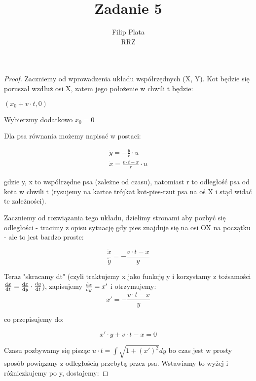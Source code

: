 \documentclass[12pt]{article}
\begin{document}
 
 
 
\title{Zadanie 5}%
\author{Filip Plata\\ %
RRZ} %
 
\maketitle
 
\begin{proof} %
Zaczniemy od wprowadzenia układu współrzędnych (X, Y). Kot będzie się poruszał wzdłuż osi X, zatem jego położenie w chwili t będzie: 

$ (x_{0} + v \cdot t, 0) $

Wybierzmy dodatkowo $x_{0} = 0$

Dla psa równania możemy napisać w postaci:

\begin{gather*} 
\dot y = - \frac{y}{r} \cdot u \\
\dot x = \frac{v \cdot t - x}{r} \cdot u
\end{gather*}

gdzie y, x to współrzędne psa (zależne od czasu), natomiast r to odległość psa od kota w chwili t (rysujemy na kartce trójkat kot-pies-rzut psa na oś X i stąd widać te zależności).

Zaczniemy od rozwiązania tego układu, dzielimy stronami aby pozbyć się odległości - tracimy z opisu sytuację gdy pies znajduje się na osi OX na początku - ale to jest bardzo proste:

\[ \frac{\dot x}{\dot y} = - \frac{v \cdot t - x}{y} \]

Teraz "skracamy dt" (czyli traktujemy x jako funkcję y i korzystamy z tożsamości $\dv{x}{t} = \dv{x}{y} \cdot \dv{y}{t} $), zapisujemy $\dv{x}{y} = x'$ i otrzymujemy:
\[ x' = - \frac{v \cdot t - x}{y} \]

co przepisujemy do:

\[ x' \cdot y + v \cdot t - x = 0 \]

Czasu pozbywamy się pisząc $ u \cdot t = \int{\sqrt{1 + (x')^2}} dy $ bo czas jest w prosty sposób powiązany z odległością przebytą przez psa. Wstawiamy to wyżej i różniczkujemy po y, dostajemy:


\end{proof}
\end{document}
